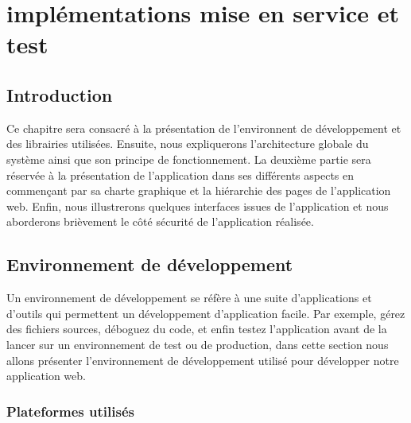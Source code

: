 \chapter{implémentations mise en service et test}
\renewcommand{\headrulewidth}{1pt}


\section{Introduction}
Ce chapitre sera consacré à la présentation de l’environnent de développement et des librairies utilisées. Ensuite, nous expliquerons l’architecture globale du système ainsi que son principe de fonctionnement. La deuxième partie sera réservée à la présentation de l’application dans ses différents aspects en commençant par sa charte graphique et la hiérarchie des pages de l’application web. Enfin, nous illustrerons quelques interfaces issues de l’application et nous aborderons brièvement le côté sécurité de l’application réalisée.   

\section{Environnement de développement}
Un environnement de développement se réfère à une suite d’applications et d’outils qui permettent un développement d’application facile. Par exemple, gérez des fichiers sources, déboguez du code, et enfin testez l’application avant de la lancer sur un environnement de test ou de production, dans cette section nous allons présenter l’environnement de développement utilisé pour développer notre application web.
    
    \subsection{Plateformes utilisés}
